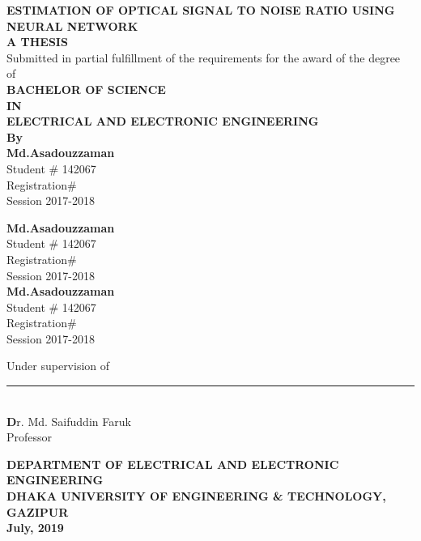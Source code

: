 \documentclass[12pt]{report}
\begin{document}
	\begin{titlepage}
	\begin{center}
		\LARGE {\bfseries {ESTIMATION OF OPTICAL SIGNAL TO NOISE RATIO USING NEURAL NETWORK}}\\
		\vspace{1cm}
		{\fontsize{12}{0} \bfseries {A THESIS}}\\
		\vspace{0.5cm}
		{\normalsize  {Submitted in partial fulfillment of the requirements for the award of the degree\\of}}\\
		{\fontsize{12}{0} \bfseries {BACHELOR OF SCIENCE}}\\
		{\fontsize{12}{0} \bfseries {IN}}\\
		{\fontsize{12}{0} \bfseries {ELECTRICAL AND ELECTRONIC ENGINEERING}}\\
		{\fontsize{12}{0} \bfseries {By}}\\
		\vspace{0.5cm}
		{\normalsize 
		\textbf{Md.Asadouzzaman}\\
		Student \# 142067\\
		Registration\# \\
		Session 2017-2018\\}
		\begin{multicols}{2}
			\normalsize 
				\textbf{Md.Asadouzzaman}\\
				Student \# 142067\\
				Registration\# \\
				Session 2017-2018\\
				\textbf{Md.Asadouzzaman}\\
				Student \# 142067\\
				Registration\# \\
				Session 2017-2018\\
		\end{multicols}
		\vspace{1cm}
		{\normalsize 
			Under supervision of\\\vspace{1cm}
			\rule{5cm}{.1cm}\\
			\textbf Dr. Md. Saifuddin Faruk\\
			Professor\\}
		\vspace{1.5cm}
		{\fontsize{12}{0} \bfseries {DEPARTMENT OF ELECTRICAL AND ELECTRONIC ENGINEERING}}\\
		{\fontsize{13}{0} \bfseries {DHAKA UNIVERSITY OF ENGINEERING \& TECHNOLOGY, GAZIPUR}}\\
		{\fontsize{12}{0} \textbf{July, 2019}}
	\end{center}
\end{titlepage}
\end{document}
